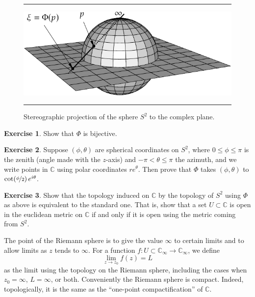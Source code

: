 \documentclass[12pt,openany]{book}
\newcommand{\C}{{\mathbb{C}}}
\newcommand{\myquote}[1]{``#1''}
\theoremstyle{plain}
\theoremstyle{remark}
\theoremstyle{definition}
\newenvironment{exbox}{%
    \def\FrameCommand{\vrule width 1pt \relax\hspace{10pt}}%
    \MakeFramed{\advance\hsize-\width\FrameRestore}%
}{%
    \endMakeFramed
}
\newenvironment{myfig}{%
\begin{figure}[h!t]
\noindent\rule{\textwidth}{0.5pt}\vspace{12pt}\par\centering}%
{\par\noindent\rule{\textwidth}{0.5pt}
\end{figure}}
\theoremstyle{exercise}
\newtheorem{exercise}{Exercise}[section]
\theoremstyle{example}
\begin{document}
\begin{myfig}
\includegraphics{figures/riemannsphere}
\caption{Stereographic projection of the sphere $S^2$ to the complex
plane.\label{fig:riemannsphere}}
\end{myfig}

\begin{exbox}
\begin{exercise}%
Show that $\Phi$ is bijective.
\end{exercise}

\begin{exercise}
Suppose $(\phi,\theta)$
are spherical coordinates on $S^2$, where $0 \leq \phi \leq \pi$ is the zenith (angle made
with the $z$-axis) and $-\pi < \theta \leq \pi$ the azimuth, and we write
points in $\C$ using polar coordinates $re^{\theta}$.  Then prove that
$\Phi$ takes
$(\phi,\theta)$ to $\cot (\nicefrac{\phi}{2})\,e^{i\theta}$.
\end{exercise}

\begin{exercise}%
Show that the topology induced on $\C$ by the topology of $S^2$ using $\Phi$
as above is equivalent to the standard one.  That is, show that a set $U
\subset \C$
is open in the euclidean metric on $\C$ if and only if it is open using the
metric coming from $S^2$.
\end{exercise}
\end{exbox}

The point of the Riemann sphere is to give the value $\infty$ to certain
limits and to allow limits as $z$ tends to $\infty$.  For a
function $f \colon U \subset \C_\infty \to \C_\infty$, we define
\begin{equation*}
\lim_{z \to z_0} f(z) = L
\end{equation*}
as the limit using the topology on the Riemann sphere, 
including
the cases when $z_0 = \infty$, $L = \infty$, or both.
Conveniently the Riemann sphere is compact.
Indeed, topologically, it is the same as the
\myquote{one-point compactification} of $\C$.
\end{document}
